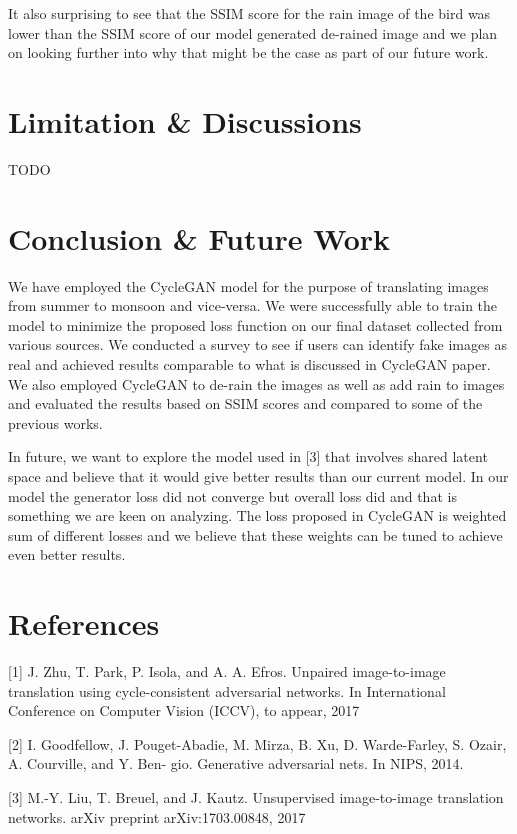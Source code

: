 \documentclass{article}
\begin{document}
It also surprising to see that the SSIM score for the rain image of the bird was lower than the SSIM score of our model generated de-rained image and we plan on looking further into why that might be the case as part of our future work. 

\section{Limitation \& Discussions}

TODO

\section{Conclusion \& Future Work}

We have employed the CycleGAN model for the purpose of translating images from summer to monsoon and vice-versa. We were successfully able to train the model to minimize the proposed loss function on our final dataset collected from various sources. We conducted a survey to see if users can identify fake images as real and achieved results comparable to what is discussed in CycleGAN paper. We also employed CycleGAN to de-rain the images as well as add rain to images and evaluated the results based on SSIM scores and compared to some of the previous works.

In future, we want to explore the model used in [3] that involves shared latent space and believe that it would give better results than our current model. In our model the generator loss did not converge but overall loss did and that is something we are keen on analyzing. The loss proposed in CycleGAN is weighted sum of different losses and we believe that these weights can be tuned to achieve even better results.

\section*{References}

\small
\label{[1]}[1] J. Zhu, T. Park, P. Isola, and A. A. Efros. Unpaired image-to-image 
translation using cycle-consistent adversarial networks. 
In International Conference on Computer Vision (ICCV), to appear, 2017

\label{[2]}[2] I. Goodfellow, J. Pouget-Abadie, M. Mirza, B. Xu, D. Warde-Farley, 
S. Ozair, A. Courville, and Y. Ben- gio. Generative adversarial nets. 
In NIPS, 2014.

\label{[3]}[3] M.-Y. Liu, T. Breuel, and J. Kautz. Unsupervised 
image-to-image translation networks. arXiv preprint arXiv:1703.00848, 2017
\end{document}
